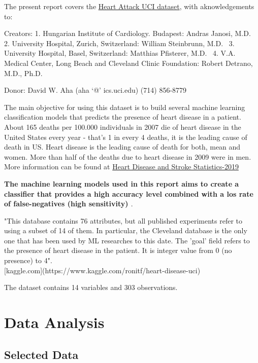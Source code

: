 \documentclass[]{article}
\begin{document}
The present report covers the
\href{https://archive.ics.uci.edu/ml/datasets/Heart+Disease}{Heart
Attack UCI dataset}, with aknowledgements to:

Creators: 1. Hungarian Institute of Cardiology. Budapest: Andras Janosi,
M.D.~ 2. University Hospital, Zurich, Switzerland: William Steinbrunn,
M.D.~ 3. University Hospital, Basel, Switzerland: Matthias Pfisterer,
M.D.~ 4. V.A. Medical Center, Long Beach and Cleveland Clinic
Foundation: Robert Detrano, M.D., Ph.D.

Donor: David W. Aha (aha `@' ics.uci.edu) (714) 856-8779

The main objective for using this dataset is to build several machine
learning classification models that predicts the presence of heart
disease in a patient. About 165 deaths per 100.000 individuals in 2007
die of heart disease in the United States every year - that's 1 in every
4 deaths, it is the leading cause of death in US. Heart disease is the
leading cause of death for both, mean and women. More than half of the
deaths due to heart disease in 2009 were in men. More information can be
found at
\href{https://healthmetrics.heart.org/wp-content/uploads/2019/02/At-A-Glance-Heart-Disease-and-Stroke-Statistics-\%E2\%80\%93-2019.pdf}{Heart
Disease and Stroke Statistics-2019}

\textbf{\textcolor{my.dark.yellow}{ The machine learning models used in this report aims to create a classifier that provides a high accuracy level combined with a los rate of false-negatives (high sensitivity) }}.

\textcolor{my.dark.green}{"This database contains 76 attributes, but all published experiments refer to using a subset of 14 of them.  In  particular, the Cleveland database is the only one that has been used by ML researches to this date.  The 'goal' field refers to the presence of heart disease in the patient.  It is integer value from 0 (no presence) to 4".}\\
\textcolor{my.dark.green}{
[kaggle.com](https://www.kaggle.com/ronitf/heart-disease-uci)
}

The dataset contains 14 variables and 303 observations.

\pagebreak

\hypertarget{data-analysis}{%
\section{Data Analysis}\label{data-analysis}}

\hypertarget{selected-data}{%
\subsection{Selected Data}\label{selected-data}}
\end{document}
